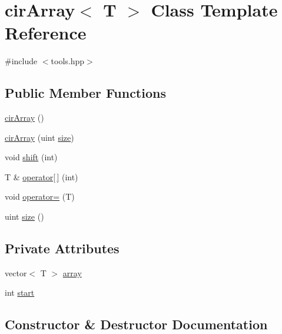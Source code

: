 \hypertarget{classcirArray}{}\section{cir\+Array$<$ T $>$ Class Template Reference}
\label{classcirArray}


{\ttfamily \#include $<$tools.\+hpp$>$}

\subsection*{Public Member Functions}
\begin{DoxyCompactItemize}
\item 
\mbox{\hyperlink{classcirArray_a4ff569017124082def843f2c36725075}{cir\+Array}} ()
\item 
\mbox{\hyperlink{classcirArray_a2241cbe0754475c1ebc4a095cedaecdd}{cir\+Array}} (uint \mbox{\hyperlink{classcirArray_a45cd2458054ae24982c2cf816292c1e1}{size}})
\item 
void \mbox{\hyperlink{classcirArray_a2d6c6f8c6692176f387c44dd53c67e8c}{shift}} (int)
\item 
T \& \mbox{\hyperlink{classcirArray_a523faf5369bc1dd91750a9106ee2d553}{operator\mbox{[}$\,$\mbox{]}}} (int)
\item 
void \mbox{\hyperlink{classcirArray_a6c8bd228590d2a4a577bdf3fe78cf58d}{operator=}} (T)
\item 
uint \mbox{\hyperlink{classcirArray_a45cd2458054ae24982c2cf816292c1e1}{size}} ()
\end{DoxyCompactItemize}
\subsection*{Private Attributes}
\begin{DoxyCompactItemize}
\item 
vector$<$ T $>$ \mbox{\hyperlink{classcirArray_ac0064a9a3b5f975c5cfea0909e4d4907}{array}}
\item 
int \mbox{\hyperlink{classcirArray_a7233e3d591e61dee5a16656f3db8f386}{start}}
\end{DoxyCompactItemize}


\subsection{Constructor \& Destructor Documentation}
\mbox{\label{classcirArray_a4ff569017124082def843f2c36725075}} 
